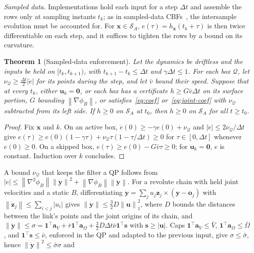 \documentclass[journal]{IEEEtran}
\newtheorem{theorem}{Theorem}
\theoremstyle{definition}
\newcommand{\norm}[1]{\left\lVert #1\right\rVert}
\begin{document}
\emph{Sampled data.} Implementations hold each input for a step $\Delta t$ and assemble the rows only
at sampling instants $t_k$; as in sampled-data CBFs~\cite{breeden2022sampled}, the intersample
evolution must be accounted for. For $\mathbf x\in\mathcal S_A$, $e(\tau)=h_{\mathbf x}(t_k+\tau)$ is then
twice differentiable on each step, and it suffices to tighten the rows by a bound on its curvature.
\begin{theorem}[Sampled-data enforcement]\label{thm:sampled}
Let the dynamics be driftless and the inputs be held on $[t_k,t_{k+1})$, with
$t_{k+1}-t_k\le\Delta t$ and $\gamma\Delta t\le1$. For each box $\mathcal Q$, let
$\nu_{\mathcal Q}\ge\frac{\Delta t}2|\ddot e|$ for its points during the step, and let $\bar v$ bound
their speed. Suppose that at every $t_k$, either $\mathbf u_k=\mathbf 0$, or each box has a
certificate $h\ge G\bar v\Delta t$ on its surface portion, $G$ bounding $\norm{\nabla\phi_B}$, or
satisfies~\eqref{eq:coef} or~\eqref{eq:joint-coef} with $\nu_{\mathcal Q}$ subtracted from its left
side. If $h\ge0$ on $\mathcal S_A$ at $t_0$, then $h\ge0$ on $\mathcal S_A$ for all $t\ge t_0$.
\end{theorem}
\begin{proof}
Fix $\mathbf x$ and $k$. On an active box, $\dot e(0)\ge-\gamma e(0)+\nu_{\mathcal Q}$ and
$|\ddot e|\le2\nu_{\mathcal Q}/\Delta t$ give
$e(\tau)\ge e(0)(1-\gamma\tau)+\nu_{\mathcal Q}\tau(1-\tau/\Delta t)\ge0$ for $\tau\in[0,\Delta t]$
whenever $e(0)\ge0$. On a skipped box, $e(\tau)\ge e(0)-G\bar v\tau\ge0$; for $\mathbf u_k=\mathbf 0$,
$e$ is constant. Induction over $k$ concludes.
\end{proof}
A bound $\nu_{\mathcal Q}$ that keeps the filter a QP follows from
$|\ddot e|\le\norm{\nabla^2\phi_B}\norm{\dot{\mathbf y}}^2+\norm{\nabla\phi_B}\norm{\ddot{\mathbf y}}$.
For a revolute chain with held joint velocities and a static $B$, differentiating
$\dot{\mathbf y}=\sum_ju_j\mathbf z_j\times(\mathbf y-\mathbf o_j)$ with
$\norm{\dot{\mathbf z}_j}\le\sum_{i<j}|u_i|$ gives $\norm{\ddot{\mathbf y}}\le\frac32D\norm{\mathbf u}_1^2$,
where $D$ bounds the distances between the link's points and the joint origins of its chain, and
$\norm{\dot{\mathbf y}}\le\sigma=\mathbf1^\top\mathbf a_V+\bar r\mathbf1^\top\mathbf a_\Omega
+\frac32D\Delta t\bar\nu\mathbf1^\top\mathbf s$ with $\mathbf s\ge|\mathbf u|$. Caps
$\mathbf1^\top\mathbf a_V\le\bar V$, $\mathbf1^\top\mathbf a_\Omega\le\bar\Omega$, and
$\mathbf1^\top\mathbf s\le\bar\nu$, enforced in the QP and adapted to the previous input, give
$\sigma\le\bar\sigma$, hence $\norm{\dot{\mathbf y}}^2\le\bar\sigma\sigma$ and
\end{document}
